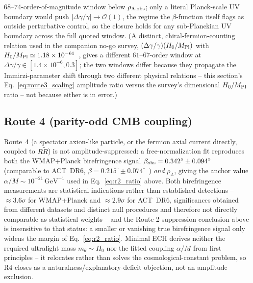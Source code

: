 \documentclass[aps,prd,twocolumn,superscriptaddress,preprintnumbers,nofootinbib,longbibliography,floatfix]{revtex4-2}
\newcommand{\MPl}{M_{\rm Pl}}
\begin{document}
$68$--$74$-order-of-magnitude window below $\rho_{\Lambda,\rm obs}$;
only a literal Planck-scale UV boundary would
push $|\Delta\gamma/\gamma|\to\mathcal O(1)$, the regime the
$\beta$-function itself flags as outside perturbative control, so the
closure holds for any sub-Planckian UV boundary across the full quoted
window. (A distinct, chiral-fermion-counting relation used in the
companion no-go survey, $(\Delta\gamma/\gamma)(H_0/\MPl)$ with
$H_0/\MPl\simeq1.18\times10^{-61}$~\cite{Golden2026P1cArxiv}, gives a
different $61$--$67$-order window at $\Delta\gamma/\gamma\in[1.4\times
10^{-6},0.3]$; the two windows differ because they propagate the
Immirzi-parameter shift through two different physical relations --
this section's Eq.~\eqref{eq:route3_scaling} amplitude ratio versus the
survey's dimensional $H_0/\MPl$ ratio -- not because either is in
error.)

\subsection{Route 4 (parity-odd CMB coupling)}
Route~4 (a spectator axion-like particle, or the fermion axial current
directly, coupled to $R\widetilde R$) is not amplitude-suppressed: a
free-normalization fit reproduces both the WMAP+Planck birefringence
signal $\beta_{\rm obs}=0.342^\circ\pm0.094^\circ$~\cite{Eskilt2022,Minami2020}
(comparable to ACT~DR6, $\beta=0.215^\circ\pm0.074^\circ$~\cite{DiegoPalazuelos2025})
\emph{and} $\rho_\Lambda$, giving the anchor value
$\alpha/M\sim10^{-21}\,\mathrm{GeV}^{-1}$ used in Eq.~\eqref{eq:r2_ratio}
above. Both birefringence measurements are statistical indications
rather than established detections -- ${\approx}3.6\sigma$ for
WMAP+Planck and ${\approx}2.9\sigma$ for ACT~DR6, significances obtained
from different datasets and distinct null procedures and therefore not
directly comparable as statistical weights -- and the Route-2 suppression
conclusion above is insensitive to that status: a smaller or vanishing
true birefringence signal only widens the margin of
Eq.~\eqref{eq:r2_ratio}. Minimal ECH derives neither the required
ultralight mass $m_\theta\sim H_0$ nor the fitted coupling $\alpha/M$
from first principles -- it relocates rather than solves the
cosmological-constant problem, so R4 closes as a
naturalness/explanatory-deficit objection, not an amplitude exclusion.
\end{document}
